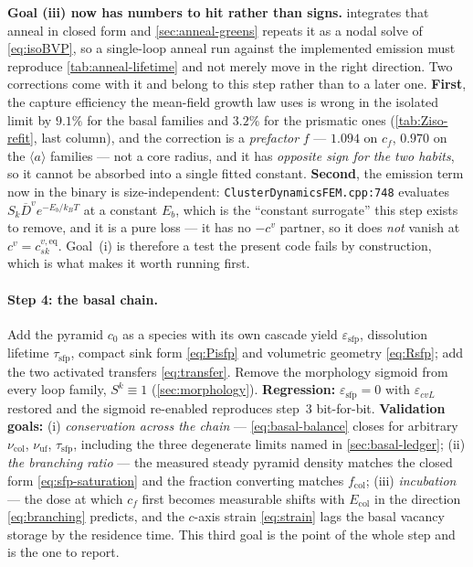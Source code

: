 \documentclass{article}
\newcommand{\aloop}{\ensuremath{\langle a\rangle}}
\newcommand{\code}[1]{\texttt{#1}}
\begin{document}
\textbf{Goal (iii) now has numbers to hit rather than signs.}
 integrates that anneal in closed form and
\cref{sec:anneal-greens} repeats it as a nodal solve of \cref{eq:isoBVP}, so a
single-loop anneal run against the implemented emission must reproduce
\cref{tab:anneal-lifetime} and not merely move in the right direction. Two
corrections come with it and belong to this step rather than to a later one.
\textbf{First}, the capture efficiency the mean-field growth law uses is wrong in
the isolated limit by $9.1\%$ for the basal families and $3.2\%$ for the
prismatic ones (\cref{tab:Ziso-refit}, last column), and the correction is a
\emph{prefactor} $f$ --- $1.094$ on $c_f$, $0.970$ on the \aloop{} families --- not
a core radius, and it has \emph{opposite sign for the two habits}, so it cannot
be absorbed into a single fitted constant. \textbf{Second}, the emission term now
in the binary is size-independent: \code{ClusterDynamicsFEM.cpp:748} evaluates
$S_k\overline D^{v}e^{-E_b/k_BT}$ at a constant $E_b$, which is the ``constant
surrogate'' this step exists to remove, and it is a pure loss --- it has no
$-c^{v}$ partner, so it does \emph{not} vanish at $c^{v}=c^{v,\mathrm{eq}}_{sk}$.
Goal~(i) is therefore a test the present code fails by construction, which is
what makes it worth running first.

\paragraph{Step 4: the basal chain.} Add the pyramid $c_0$ as a species with its
own cascade yield $\varepsilon_{\mathrm{sfp}}$, dissolution lifetime
$\tau_{\mathrm{sfp}}$, compact sink form \cref{eq:Pisfp} and volumetric geometry
\cref{eq:Rsfp}; add the two activated transfers \cref{eq:transfer}. Remove the
morphology sigmoid from every loop family, $S^k\equiv1$ (\cref{sec:morphology}).
\textbf{Regression:} $\varepsilon_{\mathrm{sfp}}=0$ with $\varepsilon_{cvL}$
restored and the sigmoid re-enabled reproduces step~3 bit-for-bit.
\textbf{Validation goals:} (i) \emph{conservation across the chain} ---
\cref{eq:basal-balance} closes for arbitrary $\nu_{\mathrm{col}}$,
$\nu_{\mathrm{uf}}$, $\tau_{\mathrm{sfp}}$, including the three degenerate limits
named in \cref{sec:basal-ledger}; (ii) \emph{the branching ratio} --- the
measured steady pyramid density matches the closed form
\cref{eq:sfp-saturation} and the fraction converting matches
$f_{\mathrm{col}}$; (iii) \emph{incubation} --- the dose at which $c_f$ first
becomes measurable shifts with $E_{\mathrm{col}}$ in the direction
\cref{eq:branching} predicts, and the $c$-axis strain \cref{eq:strain} lags the
basal vacancy storage by the residence time. This third goal is the point of the
whole step and is the one to report.
\end{document}
